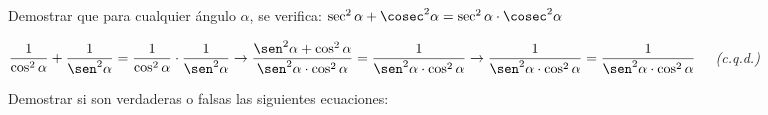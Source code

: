 \documentclass[spanish, 11pt]{exam}
\begin{document}
\begin{questions}
\begin{multicols}{3}
\end{multicols}

\question Demostrar que para cualquier ángulo $\alpha $, se verifica: $\sec^2{\alpha}+\cosec^2{\alpha}=\sec^2{\alpha}\cdot\cosec^2{\alpha}$
\begin{solution} $\dfrac{1}{\cos^2\alpha}+\dfrac{1}{\sen^2\alpha}=\dfrac{1}{\cos^2\alpha}\cdot\dfrac{1}{\sen^2\alpha}	\to \dfrac{\sen^2\alpha + \cos^2\alpha}{\sen^2\alpha \cdot \cos^2\alpha}=\dfrac{1}{\sen^2\alpha \cdot \cos^2\alpha}\to \\ \dfrac{1}{\sen^2\alpha \cdot \cos^2\alpha}=\dfrac{1}{\sen^2\alpha \cdot \cos^2\alpha}$ \ \ \emph{(c.q.d.)}\end{solution}

\question Demostrar si son verdaderas o falsas las siguientes ecuaciones:

\begin{multicols}{2}
\begin{parts}

\end{parts}
\end{multicols}
\end{questions}
\end{document}
